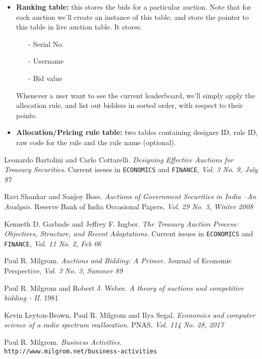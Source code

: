 \documentclass[a4paper]{article}
\begin{document}
\begin{itemize}
    \item \textbf{Ranking table:} this stores the bids for a particular auction. Note that for each auction we'll create an instance of this table, and store the pointer to this table in live auction table. 
    It stores:
    \begin{itemize}
        \item[-] Serial No.
        \item[-] Username
        \item[-] Bid value
    \end{itemize}
    Whenever a user want to see the current leaderboard, we'll simply apply the allocation rule, and list out bidders in sorted order, with respect to their points.

    \item \textbf{Allocation/Pricing rule table:} two tables containing designer ID, rule ID, raw code for the rule and the rule name (optional).
\end{itemize}



\pagebreak
\begin{thebibliography}{9}

Leonardo Bartolini and Carlo Cottarelli.
\textit{Designing Effective Auctions for Treasury Securities}. 
Current issues in \texttt{ECONOMICS} and \texttt{FINANCE}, \textit{Vol. 3 No. 9, July 97}

Ravi Shankar and Sanjoy Bose. 
\textit{Auctions of Government Securities in India –An Analysis.}
Reserve Bank of India Occasional Papers,\textit{ Vol. 29 No. 3, Winter 2008}

Kenneth D. Garbade and Jeffrey F. Ingber.
\textit{The Treasury Auction Process: Objectives, Structure, and Recent Adaptations.}
Current issues in \texttt{ECONOMICS} and \texttt{FINANCE}, \textit{Vol. 11 No. 2, Feb 06}

\bibitem{}
Paul R. Milgrom.
\textit{Auctions and Bidding: A Primer.}
Journal of Economic Perspective, \textit{Vol. 3 No. 3, Summer 89}

\bibitem{}
Paul R. Milgrom and Robert J. Weber.
\textit{A theory of auctions and competitive bidding - II.}
1981

\bibitem{}
Kevin Leyton-Brown, Paul R. Milgrom and Ilya Segal.
\textit{Economics and computer science of a radio spectrum reallocation.}
PNAS, \textit{Vol. 114 No. 28, 2017}


Paul R. Milgrom.
\textit{Business Activities.}
\\\texttt{http://www.milgrom.net/business-activities}
\end{thebibliography}
\end{document}
